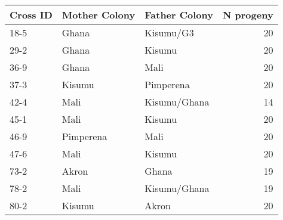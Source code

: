 
\begin{tabular}{lllr}
\toprule
Cross ID & 
Mother Colony & 
Father Colony &
N progeny \\
\midrule

18-5 & Ghana & Kisumu/G3 & 20 \\

29-2 & Ghana & Kisumu & 20 \\

36-9 & Ghana & Mali & 20 \\

37-3 & Kisumu & Pimperena & 20 \\

42-4 & Mali & Kisumu/Ghana & 14 \\

45-1 & Mali & Kisumu & 20 \\

46-9 & Pimperena & Mali & 20 \\

47-6 & Mali & Kisumu & 20 \\

73-2 & Akron & Ghana & 19 \\

78-2 & Mali & Kisumu/Ghana & 19 \\

80-2 & Kisumu & Akron & 20 \\

\bottomrule
\end{tabular}
